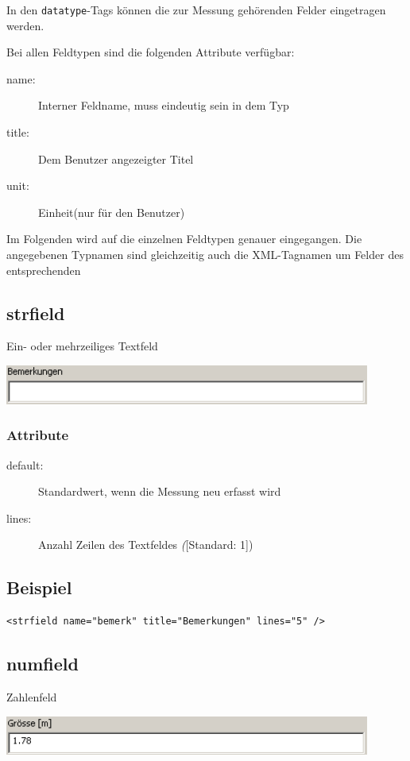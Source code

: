 \documentclass[a4paper]{scrartcl}
\begin{document}
In den \texttt{datatype}-Tags können die zur Messung gehörenden Felder
eingetragen werden.

Bei allen Feldtypen sind die folgenden Attribute verfügbar:
\begin{description}
    \item[name:] Interner Feldname, muss eindeutig sein in dem Typ
    \item[title:] Dem Benutzer angezeigter Titel
    \item[unit:] Einheit(nur für den Benutzer)
\end{description}

Im Folgenden wird auf die einzelnen Feldtypen genauer eingegangen. Die
angegebenen Typnamen sind gleichzeitig auch die XML-Tagnamen um Felder des
entsprechenden 


\subsection{strfield}
Ein- oder mehrzeiliges Textfeld
\begin{center}
    \includegraphics[width=12cm]{images/strfield.png}
\end{center}
\subsubsection{Attribute}
\begin{description}
    \item [default:] Standardwert, wenn die Messung neu erfasst wird
    \item [lines:] Anzahl Zeilen des Textfeldes \textit([Standard: 1])
\end{description}
\subsection{Beispiel}
\begin{lstlisting}
<strfield name="bemerk" title="Bemerkungen" lines="5" />
\end{lstlisting}


\subsection{numfield}
Zahlenfeld
\begin{center}
    \includegraphics[width=12cm]{images/numfield.png}
\end{center}
\end{document}
